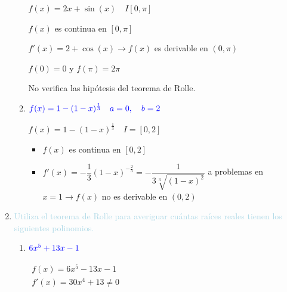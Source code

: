 \documentclass[12pt]{article}
\newcommand{\lb}[1]{\textcolor{lightblue}{#1}}
\newcommand{\db}[1]{\textcolor{blue}{#1}}
\begin{document}
\begin{enumerate}[label=\color{red}\textbf{\arabic*}),leftmargin=*, start=27]
\begin{enumerate}[label=\color{red}\alph*)]
      \begin{minipage}[l]{\textwidth}
            \begin{figure}
            \end{figure}
            
            $f(x)=2x+\sin(x)\quad I[0,\pi]$
            
            \quad\textbullet\quad $f(x)$ es continua en $[0,\pi]$
            
            \quad\textbullet\quad $f'(x)=2+\cos(x)\longrightarrow f(x)$ es derivable en $(0,\pi)$
            
            \quad\textbullet\quad $f(0)=0$ y $f(\pi)=2\pi$
            
            No verifica las hipótesis del teorema de Rolle.
      \end{minipage}
      \item $\db{f(x)=1-(1-x)^{\frac{1}{3}}\quad a=0,\quad b=2}$
      
      $f(x)=1-(1-x)^{\frac{1}{3}}\quad I=[0,2]$
      \begin{itemize}
            \item $f(x)$ es continua en $[0,2]$
            \item $f'(x)=-\dfrac{1}{3}(1-x)^{-\frac{2}{3}}=-\dfrac{1}{3\sqrt[3]{(1-x)^2}}$ a problemas en $x=1\longrightarrow f(x)$ no es derivable en $(0,2)$
      \end{itemize}
\end{enumerate}
\item \lb{Utiliza el teorema de Rolle para averiguar cuántas raíces reales tienen los siguientes polinomios.}
\begin{enumerate}[label=\color{red}\alph*), leftmargin=*]
      \item $\db{6x^5+13x-1}$
      
\begin{minipage}[l]{0.5\textwidth}
            $\begin{array}{l}
                  f(x)=6x^5-13x-1\\
                  f'(x)=30x^4+13\neq0
            \end{array}$
            

\end{minipage}
\end{enumerate}
\end{enumerate}
\end{document}
